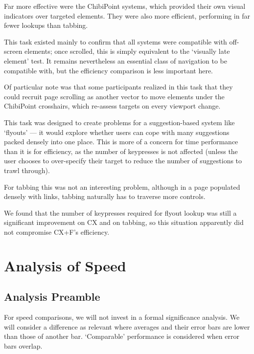 \documentclass[a4paper, 12pt]{report}
\begin{document}
Far more effective were the ChibiPoint systems, which provided their own visual indicators over targeted elements. They were also more efficient, performing in far fewer lookups than tabbing.

This task existed mainly to confirm that all systems were compatible with off-screen elements; once scrolled, this is simply equivalent to the `visually late element' test. It remains nevertheless an essential class of navigation to be compatible with, but the efficiency comparison is less important here.

Of particular note was that some participants realized in this task that they could recruit page scrolling as another vector to move elements under the ChibiPoint crosshairs, which re-assess targets on every viewport change.

This task was designed to create problems for a suggestion-based system like `flyouts' --- it would explore whether users can cope with many suggestions packed densely into one place. This is more of a concern for time performance than it is for efficiency, as the number of keypresses is not affected (unless the user chooses to over-specify their target to reduce the number of suggestions to trawl through).

For tabbing this was not an interesting problem, although in a page populated densely with links, tabbing naturally has to traverse more controls.

We found that the number of keypresses required for flyout lookup was still a significant improvement on CX and on tabbing, so this situation apparently did not compromise CX+F's efficiency.

\clearpage
\section{Analysis of Speed}
\subsection{Analysis Preamble}
For speed comparisons, we will not invest in a formal significance analysis. We will consider a difference as relevant where averages and their error bars are lower than those of another bar. `Comparable' performance is considered when error bars overlap.
\end{document}
